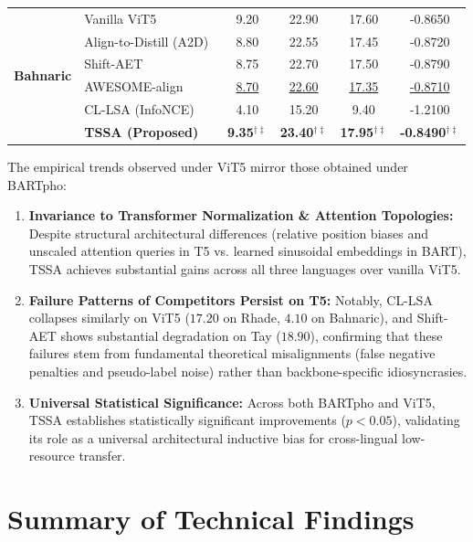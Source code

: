 \documentclass[11pt,a4paper]{article}
\begin{document}
\begin{table}[t]
\begin{tabular}{llcccc}
\midrule
\multirow{6}{*}{\textbf{Bahnaric}} & Vanilla ViT5 & 9.20 & 22.90 & 17.60 & -0.8650 \\
 & Align-to-Distill (A2D)~\cite{jin2024align} & 8.80 & 22.55 & 17.45 & -0.8720 \\
 & Shift-AET~\cite{chen2020accurate} & 8.75 & 22.70 & 17.50 & -0.8790 \\
 & AWESOME-align~\cite{dou2021word} & \underline{8.70} & \underline{22.60} & \underline{17.35} & \underline{-0.8710} \\
 & CL-LSA (InfoNCE)~\cite{chi2021infoxlm} & 4.10 & 15.20 & 9.40 & -1.2100 \\
 & \textbf{TSSA (Proposed)} & \textbf{9.35}$^{\dagger\ddagger}$ & \textbf{23.40}$^{\dagger\ddagger}$ & \textbf{17.95}$^{\dagger\ddagger}$ & \textbf{-0.8490}$^{\dagger\ddagger}$ \\
\bottomrule
\end{tabular}
\end{table}

The empirical trends observed under ViT5 mirror those obtained under BARTpho:
\begin{enumerate}[leftmargin=*]
    \item \textbf{Invariance to Transformer Normalization \& Attention Topologies:} Despite structural architectural differences (relative position biases and unscaled attention queries in T5 vs. learned sinusoidal embeddings in BART), TSSA achieves substantial gains across all three languages over vanilla ViT5.
    \item \textbf{Failure Patterns of Competitors Persist on T5:} Notably, CL-LSA collapses similarly on ViT5 ($17.20$ on Rhade, $4.10$ on Bahnaric), and Shift-AET shows substantial degradation on Tay ($18.90$), confirming that these failures stem from fundamental theoretical misalignments (false negative penalties and pseudo-label noise) rather than backbone-specific idiosyncrasies.
    \item \textbf{Universal Statistical Significance:} Across both BARTpho and ViT5, TSSA establishes statistically significant improvements ($p < 0.05$), validating its role as a universal architectural inductive bias for cross-lingual low-resource transfer.
\end{enumerate}

\section{Summary of Technical Findings}
\label{sec:findings}
\end{document}
